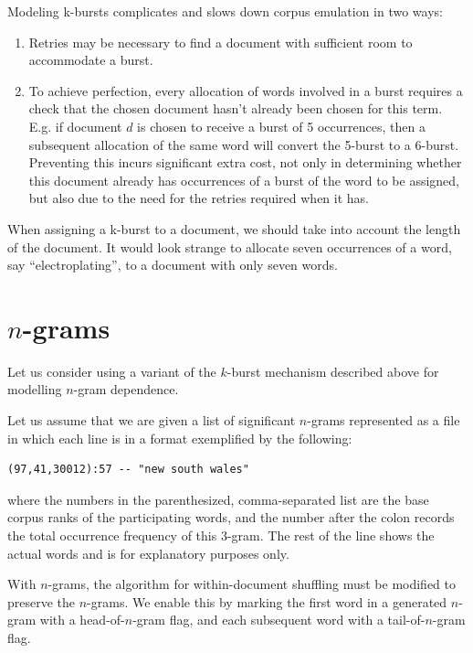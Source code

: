 \documentclass[11pt]{report}
\begin{document}
Modeling k-bursts complicates and slows down corpus emulation in two ways:

\begin{enumerate}
\item Retries may be necessary to find a document with sufficient
  room to accommodate a burst.
\item To achieve perfection, every allocation of words involved in a
  burst requires a check that the chosen document hasn't already been
  chosen for this term.  E.g. if document $d$ is chosen to receive a
  burst of 5 occurrences, then a subsequent allocation of the same
  word will convert the 5-burst to a 6-burst.  Preventing this
  incurs significant extra cost, not only in determining whether this
  document already has occurrences of a burst of the word to be assigned, but
  also due to the need for the retries required when it has.
\end{enumerate}

When assigning a k-burst to a document, we should take into account
the length of the document.  It would look strange to allocate seven
occurrences of a word, say ``electroplating'', to a document with only
seven words.


\section{$n$-grams}

Let us consider using a variant of the $k$-burst mechanism described
above for modelling $n$-gram dependence.

Let us assume that we are given a list of significant $n$-grams
represented as a file in which each line is in a format exemplified by
the following:

\begin{verbatim}
(97,41,30012):57 -- "new south wales"
\end{verbatim}

where the numbers in the parenthesized, comma-separated list are the
base corpus ranks of the participating words, and the number after the
colon records the total occurrence frequency of this 3-gram.  The rest
of the line shows the actual words and is for explanatory purposes
only.

With $n$-grams, the algorithm for within-document shuffling must be
modified to preserve the $n$-grams.  We enable this by marking the
first word in a generated $n$-gram with a head-of-$n$-gram flag, and each
subsequent word with a tail-of-$n$-gram flag.
\end{document}
